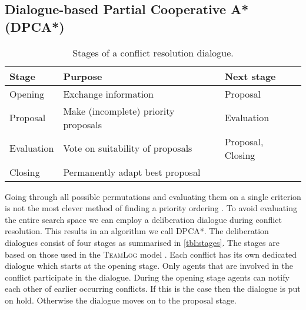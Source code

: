 \subsection{Dialogue-based Partial Cooperative A* (DPCA*)}
\begin{table}
    \centering
    \caption{Stages of a conflict resolution dialogue.}
    \label{tbl:stages}
    \begin{tabularx}{\columnwidth}{l|X|l}
        Stage & Purpose & Next stage \\ \hline
        Opening & Exchange information & Proposal \\
        Proposal & Make (incomplete) priority proposals & Evaluation \\
        Evaluation & Vote on suitability of proposals & Proposal, Closing \\
        Closing & Permanently adapt best proposal & \\
    \end{tabularx}
\end{table}

Going through all possible permutations and evaluating them on a single
criterion is not the most clever method of finding a priority ordering
\cite{bennewitz2002}. To avoid evaluating the entire search space we can employ 
a deliberation dialogue during conflict resolution. This results in an
algorithm we call DPCA*. The deliberation dialogues consist of four stages as
summarised in \autoref{tbl:stages}. The stages are based on those used in the
\textsc{TeamLog} model \cite{dunin-keplicz2011}. Each conflict has its own 
dedicated dialogue which starts at
the opening stage. Only agents that are involved in the conflict participate in
the dialogue. During the opening stage agents can notify each other of earlier
occurring conflicts. If this is the case then the dialogue is put on hold.
Otherwise the dialogue moves on to the proposal stage.

